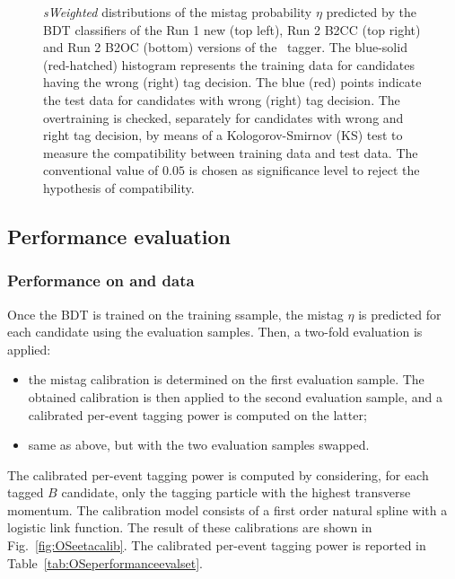 \begin{figure}[t]
\begin{center}
        \end{center}
        \vspace{-2mm}
        \caption{\emph{sWeighted} distributions of the mistag probability $\eta$ predicted by the BDT classifiers of the Run 1 new (top left), Run 2 B2CC (top right) and Run 2 B2OC (bottom) versions of the \OSe~tagger. 
          The blue-solid (red-hatched) histogram represents the training data for candidates having the wrong (right) tag decision. 
          The blue (red) points indicate the test data for candidates with wrong (right) tag decision. 
          The overtraining is checked, separately for candidates with wrong and right tag decision,
          by means of a Kologorov-Smirnov (KS) test to measure the compatibility between training data and test data.
          The conventional value of $0.05$ is chosen as significance level to reject the hypothesis of compatibility.}
        \label{fig:OSeetapredict}
\end{figure}


\subsection{Performance evaluation}


\subsubsection[Performance on $B^+\to J/\psi K^+$ and $B^+\to \Dzb \pi^+$ data]{Performance on  and  data}
\label{sec:tagging:OSePerf1}

Once the BDT is trained on the training ssample, the mistag $\eta$ is predicted for each candidate using the evaluation samples. Then, a two-fold evaluation is applied:
\begin{itemize}[noitemsep,topsep=0pt]
        \item the mistag calibration is determined on the first evaluation sample. The obtained calibration is then applied to the second evaluation sample, and a calibrated per-event tagging power is computed on the latter;
        \item same as above, but with the two evaluation samples swapped.
\end{itemize}
The calibrated per-event tagging power is computed by considering, for each tagged $B$ candidate, only the tagging particle with the highest transverse momentum.
The calibration model consists of a first order natural spline with a logistic link function.
The result of these calibrations are shown in Fig.~\ref{fig:OSeetacalib}.
The calibrated per-event tagging power is reported in Table~\ref{tab:OSeperformanceevalset}.

